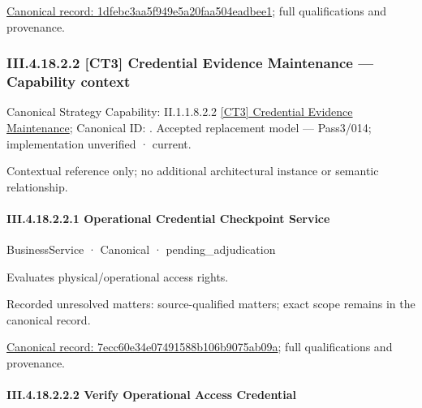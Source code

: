 {\footnotesize \href{../../../../../../../../continuum/business/business-function/1dfebc3aa5f949e5a20faa504eadbee1.md}{Canonical record: 1dfebc3aa5f949e5a20faa504eadbee1}; full qualifications and provenance.}\par
\subsubsection*{III.4.18.2.2 [CT3] Credential Evidence Maintenance — Capability context}
\label{navigation:III.4.18.2.2}

{\small Canonical Strategy Capability: II.1.1.8.2.2 \hyperref[element:ece496e1dc7e4a319318ef6811dfece7]{[CT3] Credential Evidence Maintenance}; Canonical ID: \texttt{}. Accepted replacement model — Pass3/014; implementation unverified · current.}\par
Contextual reference only; no additional architectural instance or semantic relationship.\par
\paragraph*{III.4.18.2.2.1 Operational Credential Checkpoint Service}
\label{navigation:III.4.18.2.2.1}

\label{element:7ecc60e34e07491588b106b9075ab09a}
{\small BusinessService · Canonical · pending\_adjudication}\par

Evaluates physical/operational access rights.


{\small Recorded unresolved matters: source-qualified matters; exact scope remains in the canonical record.}\par
{\footnotesize \href{../../../../../../../../continuum/business/business-service/7ecc60e34e07491588b106b9075ab09a.md}{Canonical record: 7ecc60e34e07491588b106b9075ab09a}; full qualifications and provenance.}\par
\paragraph*{III.4.18.2.2.2 Verify Operational Access Credential}
\label{navigation:III.4.18.2.2.2}

